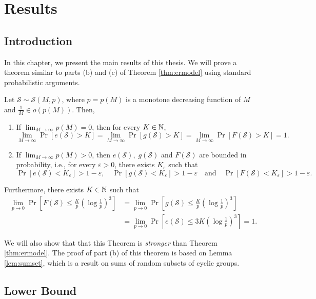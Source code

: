 \chapter{Results}\label{chap:results}


\section{Introduction}  

In this chapter, we present the main results of this thesis. We will prove a theorem similar to parts (b) and (c) of Theorem \ref{thm:ermodel} using standard probabilistic arguments. 

\begin{theorem}\label{thm:main}
    Let $\mathcal{S} \sim \mathcal{S}(M, p)$, where $p = p(M)$ is a monotone decreasing function of $M$ and $\frac{1}{M} \in o(p(M))$. Then, 
\begin{enumerate}[label=(\alph*)]
    \item If $\lim_{M \to \infty} p(M) = 0$, then for every $K \in \mathbb{N}$,   
    \[\lim_{M \to \infty} \Pr[e(\mathcal{S}) > K] = \lim_{M \to \infty} \Pr[g(\mathcal{S}) > K] = \lim_{M \to \infty} \Pr[F(\mathcal{S}) > K] = 1.\]
    \item If $\lim_{M \to \infty} p(M) > 0$, then $e(\mathcal{S}), \; g(\mathcal{S})$ and $F(\mathcal{S})$ are bounded in probability, i.e., for every $\varepsilon > 0$, there exists $K_\varepsilon$ such that 
    \[ \Pr[e(\mathcal{S}) < K_\varepsilon] > 1 - \varepsilon, \quad  \Pr[g(\mathcal{S}) < K_\varepsilon] > 1- \varepsilon \quad \text{and} \quad \Pr[F(\mathcal{S}) < K_\varepsilon] > 1 - \varepsilon.\]
\end{enumerate}
Furthermore, there exists $K \in \mathbb{N}$ such that
\begin{align*}
\lim_{p \to 0}\Pr\left[F(\mathcal{S}) \leq \frac{K}{p}\left(\log \frac{1}{p}\right)^3\right] &= \lim_{p \to 0}\Pr\left[g(\mathcal{S}) \leq \frac{K}{p}\left(\log \frac{1}{p}\right)^3\right]  
\\&= \lim_{p \to 0}\Pr\left[e(\mathcal{S}) \leq 3K\left(\log \frac{1}{p}\right)^3\right] = 1.
\end{align*}
\end{theorem}
We will also show that that this Theorem is \textit{stronger} than Theorem \ref{thm:ermodel}. The proof of part (b) of this theorem is based on Lemma \ref{lem:sumset}, which is a result on sums of random subsets of cyclic groups.  

\section{Lower Bound}\label{sec:results:lowerbound}

